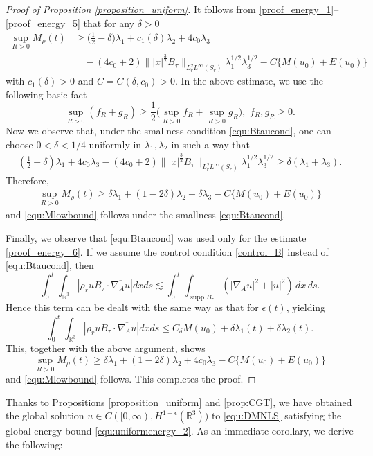 \documentclass[10pt%
]{amsart}
\numberwithin{equation}{section}
\newcommand{\R}{\mathbb{R}}
\theoremstyle{definition}
\def\supp{\mathop{\mathrm{supp}}\nolimits}
\begin{document}
\begin{proof}[Proof of Proposition \ref{proposition_uniform}]
	It follows from \eqref{proof_energy_1}--\eqref{proof_energy_5} that for any $\delta>0$ 
	\begin{align*}
		\sup_{R>0}M_\rho(t)&\ge \big(\tfrac12-\delta\big)\lambda_1+c_1(\delta)\lambda_2+4c_0\lambda_3\\
		&\quad -(4c_0+2)\||x|^{\frac32}B_\tau\|_{L^2_rL^\infty(S_r)} \lambda_1^{1/2}\lambda_3^{1/2}-C\{M(u_0)+E(u_0)\}
	\end{align*}
	with $c_1(\delta)>0$ and $C=C(\delta,c_0)>0$. In the above estimate, we use the following basic fact 
    $$\sup_{R>0}(f_R+g_R)\geq\frac12\big(\sup_{R>0}f_R+\sup_{R>0}g_R\big),\,\,f_R,g_R\geq0.$$
    Now we observe that, under the smallness condition \eqref{equ:Btaucond}, one can choose $0<\delta<1/4$ uniformly in $\lambda_1,\lambda_2$ in such a way that
	\begin{align}
		\label{proof_energy_6}
		(\tfrac12-\delta)\lambda_1+4c_0\lambda_3-(4c_0+2)\||x|^{\frac32}B_\tau\|_{L^2_rL^\infty(S_r)} \lambda_1^{1/2}\lambda_3^{1/2}\ge \delta(\lambda_1+\lambda_3).
	\end{align}
	Therefore, 
	\begin{align}
		\label{proof_energy_7}
		\sup_{R>0}M_\rho(t)\ge \delta\lambda_1+(1-2\delta)\lambda_2+\delta\lambda_3-C\{M(u_0)+E(u_0)\}
	\end{align}
	and \eqref{equ:Mlowbound} follows under the smallness \eqref{equ:Btaucond}. 




	
	Finally, we observe that \eqref{equ:Btaucond} was used only for the estimate \eqref{proof_energy_6}. If we assume the control condition \eqref{control_B} instead of \eqref{equ:Btaucond}, then
	$$
	\int_0^t\int_{\R^3}|\rho_ruB_\tau \cdot \overline{\nabla_A u}|dx ds\lesssim \int_0^t\int_{\supp B_\tau}(|\nabla_Au|^2+|u|^2)\,dx\,ds.
	$$
	Hence this term can be dealt with the same way as that for $\epsilon(t)$, yielding 
	$$
	\int_0^t\int_{\R^3}|\rho_ruB_\tau \cdot \overline{\nabla_A u}|dx ds\le C_\delta M(u_0)+\delta\lambda_1(t)+\delta\lambda_2(t). 
	$$
	This, together with the above argument, shows
	$$
	\sup_{R>0}M_\rho(t)\ge \delta\lambda_1+(1-2\delta)\lambda_2+4c_0\lambda_3-C\{M(u_0)+E(u_0)\}
	$$
	and \eqref{equ:Mlowbound} follows. This completes the proof. 
\end{proof}

Thanks to Propositions \ref{proposition_uniform} and \ref{prop:CGT}, we have obtained the global solution $u\in C([0,\infty),H^{1+\epsilon}(\R^3))$ to \eqref{equ:DMNLS} satisfying the global energy bound \eqref{equ:uniformenergy_2}. As an immediate corollary, we derive the following: 
\end{document}
